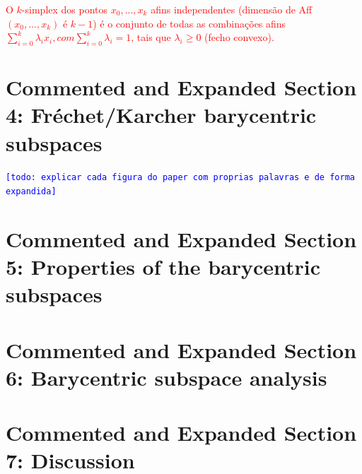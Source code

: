 \documentclass[a4paper,titlepage]{article}
\newcommand{\indraftnote}[1]{\textcolor{blue}{\texttt{\footnotesize [#1]}}}
\newcommand{\todo}[1]{\indraftnote{todo: #1}} %
\newcommand{\juliana}[1]{\textcolor{red}{#1}}
\begin{document}
\juliana{O $k$-simplex dos pontos $x_0, ..., x_k$ afins independentes (dimensão de Aff$(x_0 ,..., x_k)$ é $k-1$) é o conjunto de todas as combinações afins $\sum_{i=0}^k \lambda_i x_i, com \sum_{i=0}^k \lambda_i=1$, tais que $\lambda_i \geq 0$ (fecho convexo).}

{
\vspace{1em}
\vspace{1em}
}

\section{Commented and Expanded Section 4: Fréchet/Karcher barycentric subspaces}

{
\vspace{1em}
\vspace{1em}
}


\todo{explicar cada figura do paper com proprias palavras e de forma expandida}

\section{Commented and Expanded Section 5: Properties of the barycentric
subspaces}

\section{Commented and Expanded Section 6: Barycentric subspace analysis}

\section{Commented and Expanded Section 7: Discussion}
\end{document}
